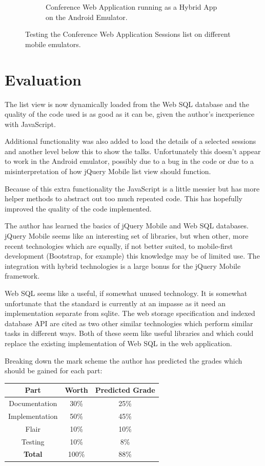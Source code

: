 \documentclass[10pt, a4paper]{article}
\begin{document}
\begin{figure}[h]
\begin{subfigure}[b]{0.4\textwidth}
\caption{Conference Web Application running as a Hybrid App on the Android
         Emulator.}
\end{subfigure}
\caption{Testing the Conference Web Application Sessions list on different
         mobile emulators.}
\label{fig:testing}
\end{figure}


\section{Evaluation}
The list view is now dynamically loaded from the Web SQL database and the
quality of the code used is as good as it can be, given the author's
inexperience with JavaScript.

Additional functionality was also added to load the details of a selected
sessions and another level below this to show the talks. Unfortunately this
doesn't appear to work in the Android emulator, possibly due to a bug in the
code or due to a misinterpretation of how jQuery Mobile list view should
function.

Because of this extra functionality the JavaScript is a little messier but has
more helper methods to abstract out too much repeated code. This has hopefully
improved the quality of the code implemented.

The author has learned the basics of jQuery Mobile and Web SQL databases.
jQuery Mobile seems like an interesting set of libraries, but when other, more
recent technologies which are equally, if not better suited, to mobile-first
development (Bootstrap, for example) this knowledge may be of limited use. The
integration with hybrid technologies is a large bonus for the jQuery Mobile
framework.

Web SQL seems like a useful, if somewhat unused technology. It is somewhat
unfortunate that the standard is currently at an impasse as it need an
implementation separate from sqlite. The web storage specification and indexed
database API are cited as two other similar technologies which perform similar
tasks in different ways. Both of these seem like useful libraries and which
could replace the existing implementation of Web SQL in the web application.

Breaking down the mark scheme the author has predicted the grades which should
be gained for each part:

\begin{table}[h]
\centering
\begin{tabular}{| c | c | c |}\hline
\textbf{Part}	& \textbf{Worth}	& \textbf{Predicted Grade} \\ \hline
Documentation	& 30\%			& 25\% \\ 
Implementation	& 50\%			& 45\% \\ 
Flair		& 10\%			& 10\% \\ 
Testing		& 10\%			& 8\% \\ \hline
\textbf{Total}	& 100\%			& 88\% \\ \hline
\end{tabular}
\end{table}
\end{document}
